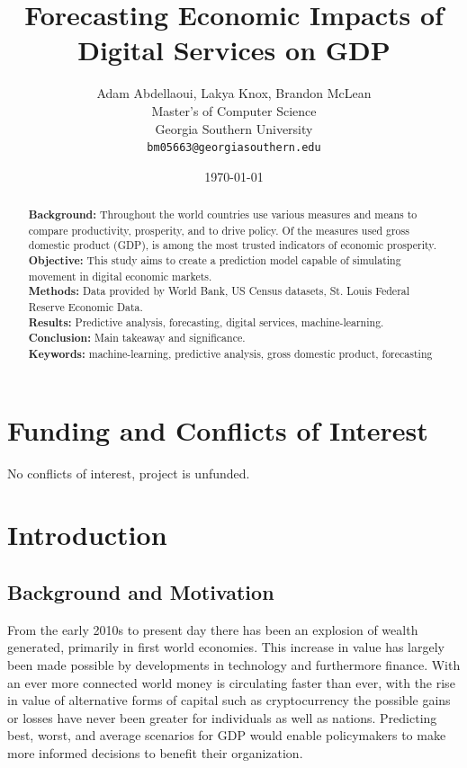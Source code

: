 \documentclass[12pt]{article}
\title{Forecasting Economic Impacts of Digital Services on GDP}
\author{Adam Abdellaoui, Lakya Knox, Brandon McLean \\[1ex]
    Master's of Computer Science \\
    Georgia Southern University \\
    \texttt{bm05663@georgiasouthern.edu}
}
\date{\today}
\begin{document}
\maketitle

\begin{abstract}
\noindent
\textbf{Background:} Throughout the world countries use various measures and means to compare productivity, prosperity, and to drive policy. Of the measures used gross domestic product (GDP), is among the most trusted indicators of economic prosperity.  \\
\textbf{Objective:} This study aims to create a prediction model capable of simulating movement in digital economic markets. \\
\textbf{Methods:} Data provided by World Bank, US Census datasets, St. Louis Federal Reserve Economic Data. \\
\textbf{Results:} Predictive analysis, forecasting, digital services, machine-learning. \\
\textbf{Conclusion:} Main takeaway and significance. \\[1ex]
\textbf{Keywords:} machine-learning, predictive analysis, gross domestic product, forecasting
\end{abstract}

\section*{Funding and Conflicts of Interest}
No conflicts of interest, project is unfunded.

\tableofcontents
\newpage

\section{Introduction}
    \subsection*{Background and Motivation}
        From the early 2010s to present day there has been an explosion of wealth generated, primarily in first world economies. This increase in value has largely been made possible by developments in technology and furthermore finance. With an ever more connected world money is circulating faster than ever, with the rise in value of alternative forms of capital such as cryptocurrency the possible gains or losses have never been greater for individuals as well as nations. Predicting best, worst, and average scenarios for GDP would enable policymakers to make more informed decisions to benefit their organization.
\end{document}
